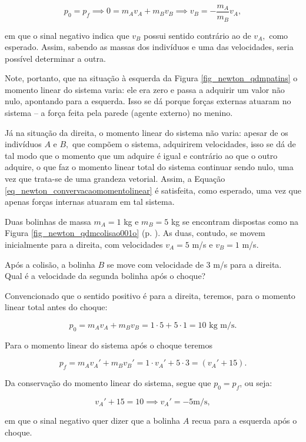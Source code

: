 $$ p_0 = p_f \implies 0 = m_Av_A + m_Bv_B \implies v_B = -\dfrac{m_A}{m_B} v_A,$$

\noindent em que o sinal negativo indica que $v_B$ possui sentido contrário ao de $v_A,$ como esperado. Assim, sabendo as massas dos indivíduos e uma das velocidades, seria possível determinar a outra.

Note, portanto, que na situação à esquerda da Figura \ref{fig_newton_qdmpatins} o momento linear do sistema varia: ele era zero e passa a adquirir um valor não nulo, apontando para a esquerda. Isso se dá porque forças externas atuaram no sistema -- a força feita pela parede (agente externo) no menino.

Já na situação da direita, o momento linear do sistema não varia: apesar de os indivíduos $A$ e $B,$ que compõem o sistema, adquirirem velocidades, isso se dá de tal modo que o momento que um adquire é igual e contrário ao que o outro adquire, o que faz o momento linear total do sistema continuar sendo nulo, uma vez que trata-se de uma grandeza vetorial. Assim, a Equação \eqref{eq_newton_convervacaomomentolinear} é satisfeita, como esperado, uma vez que apenas forças internas atuaram em tal sistema.



\vspace{0.3cm}


\begin{exemplo}[Nível I]\label{exemplo_newton_conservacaomomentolinearex01}

Duas bolinhas de massa $m_A=1$ kg e $m_B =5$ kg se encontram dispostas como na Figura \ref{fig_newton_qdmcolisao001o} (p. \pageref{fig_newton_qdmcolisao001o}). As duas, contudo, se movem inicialmente para a direita, com velocidades $v_A = 5$ m/s e $v_B = 1$ m/s.

Após a colisão, a bolinha $B$ se move com velocidade de $3$ m/s para a direita. Qual é a velocidade da segunda bolinha após o choque?

\resolucao

Convencionado que o sentido positivo é para a direita, teremos, para o momento linear total antes do choque:

$$ p_0 = m_Av_A + m_Bv_B = 1 \cdot 5 + 5 \cdot 1 = 10 \text{ kg m/s}.$$

Para o momento linear do sistema após o choque teremos

$$  p_f = m_Av_A' + m_Bv_B' = 1 \cdot v_A'+ 5 \cdot 3 = (v_A'+ 15). $$

Da conservação do momento linear do sistema, segue que $p_0 = p_f$, ou seja:

$$ v_A'+ 15 = 10 \implies  \boxed{v_A' = -5 \text{m/s} ,}$$

\noindent em que o sinal negativo quer dizer que a bolinha $A$ recua para a esquerda após o choque.

\end{exemplo}


